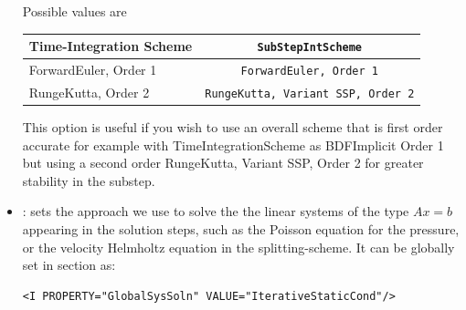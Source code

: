 \begin{itemize}
Possible values are
\begin{center}
\footnotesize
\begin{tabular}{lc}
\toprule
{Time-Integration Scheme} & \texttt{SubStepIntScheme} \\
\midrule
ForwardEuler, Order 1 & \texttt{ForwardEuler, Order 1}  \\
RungeKutta, Order 2 & \texttt{RungeKutta, Variant SSP, Order 2}  \\
\bottomrule
\end{tabular}
\end{center}

This option is useful if you wish to use an overall scheme that is
first order accurate for example with TimeIntegrationScheme as
BDFImplicit Order 1 but using a second order RungeKutta, Variant SSP,
Order 2 for greater stability in the substep.

\item {}: sets the approach we use to solve the the linear
systems of the type $Ax=b$ appearing in the solution steps, such as the Poisson
equation for the pressure, or the velocity Helmholtz equation in the splitting-scheme. It can be globally set in section  as:
%
\begin{lstlisting}[style=XMLStyle]
<I PROPERTY="GlobalSysSoln" VALUE="IterativeStaticCond"/>
\end{lstlisting}


\end{itemize}

